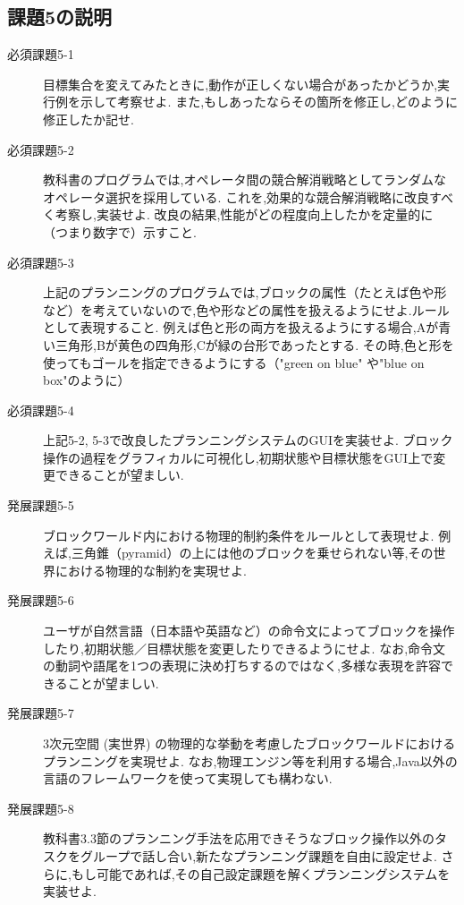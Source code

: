 \documentclass[12pt]{jarticle}
\begin{document}
\subsection{課題5の説明}
\begin{description}
\item[必須課題5-1] 目標集合を変えてみたときに,動作が正しくない場合があったかどうか,実行例を示して考察せよ.
また,もしあったならその箇所を修正し,どのように修正したか記せ.
\item[必須課題5-2] 教科書のプログラムでは,オペレータ間の競合解消戦略としてランダムなオペレータ選択を採用している.
これを,効果的な競合解消戦略に改良すべく考察し,実装せよ.
改良の結果,性能がどの程度向上したかを定量的に（つまり数字で）示すこと.
\item[必須課題5-3] 上記のプランニングのプログラムでは,ブロックの属性（たとえば色や形など）を考えていないので,色や形などの属性を扱えるようにせよ.ルールとして表現すること.
例えば色と形の両方を扱えるようにする場合,Aが青い三角形,Bが黄色の四角形,Cが緑の台形であったとする.
その時,色と形を使ってもゴールを指定できるようにする（"green on blue" や"blue on box"のように）
\item[必須課題5-4] 上記5-2, 5-3で改良したプランニングシステムのGUIを実装せよ.
ブロック操作の過程をグラフィカルに可視化し,初期状態や目標状態をGUI上で変更できることが望ましい.
\item[発展課題5-5] ブロックワールド内における物理的制約条件をルールとして表現せよ.
例えば,三角錐（pyramid）の上には他のブロックを乗せられない等,その世界における物理的な制約を実現せよ.
\item[発展課題5-6] ユーザが自然言語（日本語や英語など）の命令文によってブロックを操作したり,初期状態／目標状態を変更したりできるようにせよ.
なお,命令文の動詞や語尾を1つの表現に決め打ちするのではなく,多様な表現を許容できることが望ましい.
\item[発展課題5-7] 3次元空間 (実世界) の物理的な挙動を考慮したブロックワールドにおけるプランニングを実現せよ.
なお,物理エンジン等を利用する場合,Java以外の言語のフレームワークを使って実現しても構わない.
\item[発展課題5-8] 教科書3.3節のプランニング手法を応用できそうなブロック操作以外のタスクをグループで話し合い,新たなプランニング課題を自由に設定せよ.
さらに,もし可能であれば,その自己設定課題を解くプランニングシステムを実装せよ.
\end{description}
\end{document}
